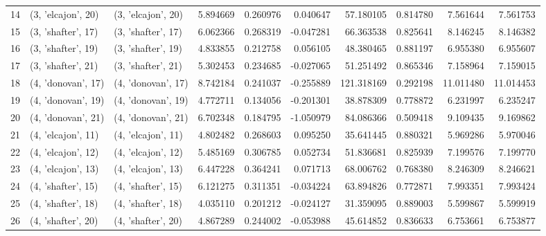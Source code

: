 \begin{tabular}{lllrrrrrrr}
14 &  (3, 'elcajon', 20) &  (3, 'elcajon', 20) &  5.894669 &  0.260976 &  0.040647 &   57.180105 &  0.814780 &   7.561644 &   7.561753 \\
15 &  (3, 'shafter', 17) &  (3, 'shafter', 17) &  6.062366 &  0.268319 & -0.047281 &   66.363538 &  0.825641 &   8.146245 &   8.146382 \\
16 &  (3, 'shafter', 19) &  (3, 'shafter', 19) &  4.833855 &  0.212758 &  0.056105 &   48.380465 &  0.881197 &   6.955380 &   6.955607 \\
17 &  (3, 'shafter', 21) &  (3, 'shafter', 21) &  5.302453 &  0.234685 & -0.027065 &   51.251492 &  0.865346 &   7.158964 &   7.159015 \\
18 &  (4, 'donovan', 17) &  (4, 'donovan', 17) &  8.742184 &  0.241037 & -0.255889 &  121.318169 &  0.292198 &  11.011480 &  11.014453 \\
19 &  (4, 'donovan', 19) &  (4, 'donovan', 19) &  4.772711 &  0.134056 & -0.201301 &   38.878309 &  0.778872 &   6.231997 &   6.235247 \\
20 &  (4, 'donovan', 21) &  (4, 'donovan', 21) &  6.702348 &  0.184795 & -1.050979 &   84.086366 &  0.509418 &   9.109435 &   9.169862 \\
21 &  (4, 'elcajon', 11) &  (4, 'elcajon', 11) &  4.802482 &  0.268603 &  0.095250 &   35.641445 &  0.880321 &   5.969286 &   5.970046 \\
22 &  (4, 'elcajon', 12) &  (4, 'elcajon', 12) &  5.485169 &  0.306785 &  0.052734 &   51.836681 &  0.825939 &   7.199576 &   7.199770 \\
23 &  (4, 'elcajon', 13) &  (4, 'elcajon', 13) &  6.447228 &  0.364241 &  0.071713 &   68.006762 &  0.768380 &   8.246309 &   8.246621 \\
24 &  (4, 'shafter', 15) &  (4, 'shafter', 15) &  6.121275 &  0.311351 & -0.034224 &   63.894826 &  0.772871 &   7.993351 &   7.993424 \\
25 &  (4, 'shafter', 18) &  (4, 'shafter', 18) &  4.035110 &  0.201212 & -0.024127 &   31.359095 &  0.889003 &   5.599867 &   5.599919 \\
26 &  (4, 'shafter', 20) &  (4, 'shafter', 20) &  4.867289 &  0.244002 & -0.053988 &   45.614852 &  0.836633 &   6.753661 &   6.753877 \\
\bottomrule
\end{tabular}
